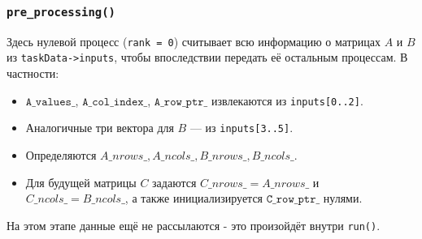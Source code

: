 \documentclass[12pt]{article}
\begin{document}
\subsubsection{\texttt{pre\_processing()}}
Здесь нулевой процесс (\texttt{rank = 0}) считывает всю информацию о матрицах \(A\) и \(B\) из \texttt{taskData->inputs}, чтобы впоследствии передать её остальным процессам. В частности:
\begin{itemize}
    \item \(\texttt{A\_values\_}\), \(\texttt{A\_col\_index\_}\), \(\texttt{A\_row\_ptr\_}\) извлекаются из \texttt{inputs[0..2]}.
    \item Аналогичные три вектора для \(B\) --- из \texttt{inputs[3..5]}.
    \item Определяются \(A\_nrows\_, A\_ncols\_, B\_nrows\_, B\_ncols\_\).
    \item Для будущей матрицы \(C\) задаются \(C\_nrows\_ = A\_nrows\_\) и \(C\_ncols\_ = B\_ncols\_\), а также инициализируется \(\texttt{C\_row\_ptr\_}\) нулями.
\end{itemize}
На этом этапе данные ещё не рассылаются - это произойдёт внутри \texttt{run()}.
\end{document}
